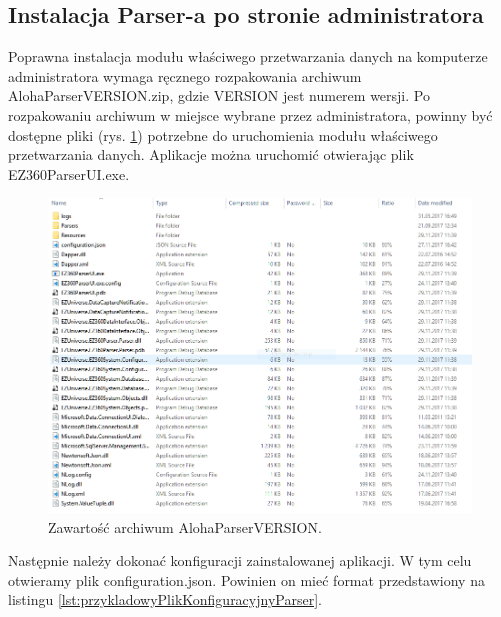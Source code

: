 \documentclass[a4paper]{book}
\begin{document}
\subsection{Instalacja Parser-a po stronie administratora}
\newpage Poprawna instalacja modułu właściwego przetwarzania danych na komputerze administratora wymaga ręcznego rozpakowania archiwum AlohaParserVERSION.zip, gdzie VERSION jest numerem wersji. Po rozpakowaniu archiwum w miejsce wybrane przez administratora, powinny być dostępne pliki (rys. \ref{fig:aloha_parser_content}) potrzebne do uruchomienia modułu właściwego przetwarzania danych.
Aplikacje można uruchomić otwierając plik EZ360ParserUI.exe.
\begin{figure}[h]
	\centering
	\includegraphics[width=\textwidth]{./img/aloha_parser_content.png}
	\caption{Zawartość archiwum AlohaParserVERSION.}
	\label{fig:aloha_parser_content}
\end{figure}
Następnie należy dokonać konfiguracji zainstalowanej aplikacji. W tym celu otwieramy plik configuration.json. Powinien on mieć format przedstawiony na listingu \ref{lst:przykladowyPlikKonfiguracyjnyParser}.
\end{document}
